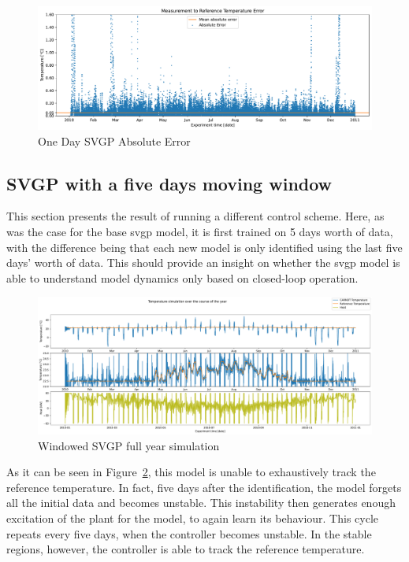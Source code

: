 \begin{figure}[ht]
    \centering
    \includegraphics[width =
    \textwidth]{Plots/6_SVGP_96pts_inf_window_12_averageYear_abserr.pdf}
    \caption{One Day SVGP Absolute Error}
    \label{fig:SVGP_96pts_abserr}
\end{figure}

\subsection{SVGP with a five days moving window}\label{sec:svgp_window}

This section presents the result of running a different control scheme. Here, as
was the case for the base \acrshort{svgp} model, it is first trained on 5 days
worth of data, with the difference being that each new model is only identified
using the last five days' worth of data. This should provide an insight on
whether the \acrshort{svgp} model is able to understand model dynamics only
based on closed-loop operation.

\begin{figure}[ht]
    \centering
    \includegraphics[width =
    \textwidth]{Plots/5_SVGP_480pts_480pts_window_12_averageYear_fullyear.pdf}
    \caption{Windowed SVGP full year simulation}
    \label{fig:SVGP_480window_fullyear_simulation}
\end{figure}

As it can be seen in Figure~\ref{fig:SVGP_480window_fullyear_simulation}, this
model is unable to exhaustively track the reference temperature. In fact, five days
after the identification, the model forgets all the initial data and becomes
unstable. This instability then generates enough excitation of the plant for the
model, to again learn its behaviour. This cycle repeats every five days, when the
controller becomes unstable. In the stable regions, however, the controller is
able to track the reference temperature. 

